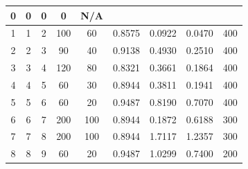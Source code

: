 \documentclass[12pt]{article}
\begin{document}
\begin{table}[htbp]
{\begin{tabular}{|ccccccccc|}
				\multicolumn{1}{c|}{0} &
				\multicolumn{1}{c|}{0} &
				\multicolumn{1}{c|}{0} &
				\multicolumn{1}{c|}{0} &
				N/A \\ \hline
				\multicolumn{1}{|c|}{1} &
				\multicolumn{1}{c|}{1} &
				\multicolumn{1}{c|}{2} &
				\multicolumn{1}{c|}{100} &
				\multicolumn{1}{c|}{60} &
				\multicolumn{1}{c|}{0.8575} &
				\multicolumn{1}{c|}{0.0922} &
				\multicolumn{1}{c|}{0.0470} &
				400 \\ \hline
				\multicolumn{1}{|c|}{2} &
				\multicolumn{1}{c|}{2} &
				\multicolumn{1}{c|}{3} &
				\multicolumn{1}{c|}{90} &
				\multicolumn{1}{c|}{40} &
				\multicolumn{1}{c|}{0.9138} &
				\multicolumn{1}{c|}{0.4930} &
				\multicolumn{1}{c|}{0.2510} &
				400 \\ \hline
				\multicolumn{1}{|c|}{3} &
				\multicolumn{1}{c|}{3} &
				\multicolumn{1}{c|}{4} &
				\multicolumn{1}{c|}{120} &
				\multicolumn{1}{c|}{80} &
				\multicolumn{1}{c|}{0.8321} &
				\multicolumn{1}{c|}{0.3661} &
				\multicolumn{1}{c|}{0.1864} &
				400 \\ \hline
				\multicolumn{1}{|c|}{4} &
				\multicolumn{1}{c|}{4} &
				\multicolumn{1}{c|}{5} &
				\multicolumn{1}{c|}{60} &
				\multicolumn{1}{c|}{30} &
				\multicolumn{1}{c|}{0.8944} &
				\multicolumn{1}{c|}{0.3811} &
				\multicolumn{1}{c|}{0.1941} &
				400 \\ \hline
				\multicolumn{1}{|c|}{5} &
				\multicolumn{1}{c|}{5} &
				\multicolumn{1}{c|}{6} &
				\multicolumn{1}{c|}{60} &
				\multicolumn{1}{c|}{20} &
				\multicolumn{1}{c|}{0.9487} &
				\multicolumn{1}{c|}{0.8190} &
				\multicolumn{1}{c|}{0.7070} &
				400 \\ \hline
				\multicolumn{1}{|c|}{6} &
				\multicolumn{1}{c|}{6} &
				\multicolumn{1}{c|}{7} &
				\multicolumn{1}{c|}{200} &
				\multicolumn{1}{c|}{100} &
				\multicolumn{1}{c|}{0.8944} &
				\multicolumn{1}{c|}{0.1872} &
				\multicolumn{1}{c|}{0.6188} &
				300 \\ \hline
				\multicolumn{1}{|c|}{7} &
				\multicolumn{1}{c|}{7} &
				\multicolumn{1}{c|}{8} &
				\multicolumn{1}{c|}{200} &
				\multicolumn{1}{c|}{100} &
				\multicolumn{1}{c|}{0.8944} &
				\multicolumn{1}{c|}{1.7117} &
				\multicolumn{1}{c|}{1.2357} &
				300 \\ \hline
				\multicolumn{1}{|c|}{8} &
				\multicolumn{1}{c|}{8} &
				\multicolumn{1}{c|}{9} &
				\multicolumn{1}{c|}{60} &
				\multicolumn{1}{c|}{20} &
				\multicolumn{1}{c|}{0.9487} &
				\multicolumn{1}{c|}{1.0299} &
				\multicolumn{1}{c|}{0.7400} &
				200 \\ \hline

\end{tabular}}
\end{table}
\end{document}
